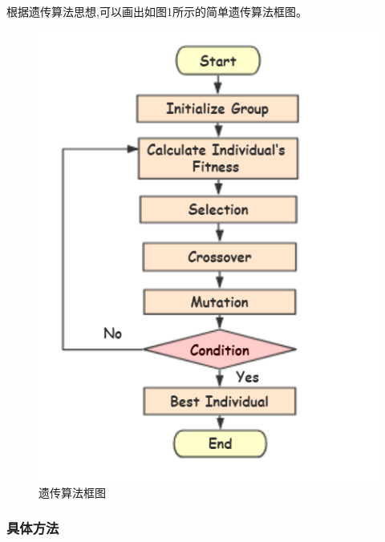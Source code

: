 \documentclass[10.5pt,twocolumn]{jbuaa}
\begin{document}
根据遗传算法思想,可以画出如图1所示的简单遗传算法框图。
\begin{figure}[H]
	\centering
	\includegraphics[scale=0.8]{./image/GA_ENG}
	\caption{遗传算法框图}
\end{figure}
\subsubsection{具体方法}
\end{document}
